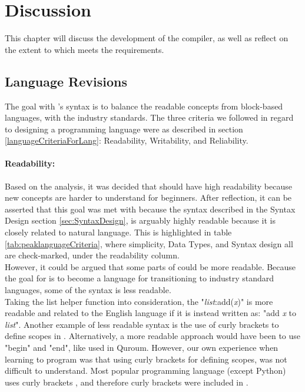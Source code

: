 \chapter{Discussion}
This chapter will discuss the development of the \lang compiler, as well as reflect on the extent to which \lang meets the requirements. 

\section{Language Revisions}
The goal with \lang's syntax is to balance the readable concepts from block-based languages, with the industry standards. The three criteria we followed in regard to designing a programming language were as described in section \ref{languageCriteriaForLang}: Readability, Writability, and Reliability.

\subsubsection{Readability:}
Based on the analysis, it was decided that \lang should have high readability because new concepts are harder to understand for beginners. After reflection, it can be asserted that this goal was met with \lang because the syntax described in the Syntax Design section \ref{sec:SyntaxDesign}, is arguably highly readable because it is closely related to natural language. This is highlighted in table \ref{tab:peaklanguageCriteria}, where simplicity, Data Types, and Syntax design all are check-marked, under the readability column.\\

However, it could be argued that some parts of \lang could be more readable. Because the goal for \lang is to become a language for transitioning to industry standard languages, some of the syntax is less readable.\\
Taking the list helper function into consideration, the "\textit{list}:add(\textit{x})" is more readable and related to the English language if it is instead written as: "add \textit{x} to \textit{list}". Another example of less readable syntax is the use of curly brackets to define scopes in \lang. Alternatively, a more readable approach would have been to use "begin" and "end", like used in Quroum. However, our own experience when learning to program was that using curly brackets for defining scopes, was not difficult to understand. Most popular programming language (except Python) uses curly brackets \cite{TopProgrammingLanguages2022}, and therefore curly brackets were included in \lang. 


